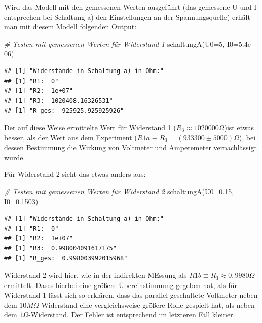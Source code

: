 \documentclass[
  9pt,
]{article}
\newenvironment{Shaded}{\begin{snugshade}}{\end{snugshade}}
\newcommand{\AttributeTok}[1]{\textcolor[rgb]{0.77,0.63,0.00}{#1}}
\newcommand{\CommentTok}[1]{\textcolor[rgb]{0.56,0.35,0.01}{\textit{#1}}}
\newcommand{\DecValTok}[1]{\textcolor[rgb]{0.00,0.00,0.81}{#1}}
\newcommand{\FloatTok}[1]{\textcolor[rgb]{0.00,0.00,0.81}{#1}}
\newcommand{\FunctionTok}[1]{\textcolor[rgb]{0.00,0.00,0.00}{#1}}
\newcommand{\NormalTok}[1]{#1}
\begin{document}
Wird das Modell mit den gemessenen Werten ausgeführt (das gemessene U
und I entsprechen bei Schaltung a) den Einstellungen an der
Spannungsquelle) erhält man mit diesem Modell folgenden Output:

\begin{Shaded}
\begin{Highlighting}[]
\CommentTok{\# Testen mit gemessenen Werten für Widerstand 1}
\FunctionTok{schaltungA}\NormalTok{(}\AttributeTok{U0=}\DecValTok{5}\NormalTok{, }\AttributeTok{I0=}\FloatTok{5.4e{-}06}\NormalTok{)}
\end{Highlighting}
\end{Shaded}

\begin{verbatim}
## [1] "Widerstände in Schaltung a) in Ohm:"
## [1] "R1:  0"
## [1] "R2:  1e+07"
## [1] "R3:  1020408.16326531"
## [1] "R_ges:  925925.925925926"
\end{verbatim}

Der auf diese Weise ermittelte Wert für Widerstand 1
(\(R_3\approx 1020000\Omega\))ist etwas besser, als der Wert aus dem
Experiment (\(R1a \equiv R_3 = (933300 \pm 5000)\Omega\)), bei dessen
Bestimmung die Wirkung von Voltmeter und Amperemeter vernachlässigt
wurde.

Für Widerstand 2 sieht das etwas anders aus:

\begin{Shaded}
\begin{Highlighting}[]
\CommentTok{\# Testen mit gemessenen Werten für Widerstand 2}
\FunctionTok{schaltungA}\NormalTok{(}\AttributeTok{U0=}\FloatTok{0.15}\NormalTok{, }\AttributeTok{I0=}\FloatTok{0.1503}\NormalTok{)}
\end{Highlighting}
\end{Shaded}

\begin{verbatim}
## [1] "Widerstände in Schaltung a) in Ohm:"
## [1] "R1:  0"
## [1] "R2:  1e+07"
## [1] "R3:  0.998004091617175"
## [1] "R_ges:  0.998003992015968"
\end{verbatim}

Widerstand 2 wird hier, wie in der indirekten MEssung als
\(R1b\equiv R_3 \approx 0,9980\Omega\) ermittelt. Dases hierbei eine
größere Übereinstimmung gegeben hat, als für Widerstand 1 lässt sich so
erklären, dass das parallel geschaltete Voltmeter neben dem
\(10M\Omega\)-Widerstand eine vergleichsweise größere Rolle gespielt
hat, als neben dem \(1\Omega\)-Widerstand. Der Fehler ist entsprechend
im letzteren Fall kleiner.
\end{document}
